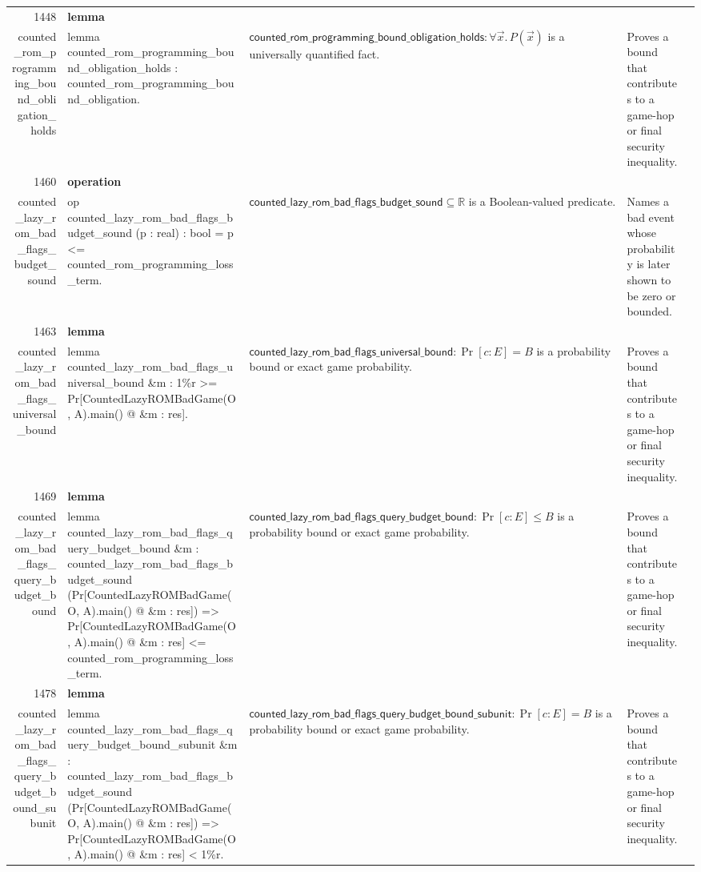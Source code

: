 \documentclass[10pt]{article}
\newcommand{\ec}[1]{\begingroup\ttfamily\scriptsize #1\endgroup}
\begin{document}
\begin{longtable}{r L{0.17\textwidth} L{0.26\textwidth} L{0.27\textwidth} L{0.20\textwidth}}
1448 & \textbf{lemma}\\\ec{counted\_rom\_programming\_bound\_obligation\_holds} & \ec{lemma counted\_rom\_programming\_bound\_obligation\_holds : counted\_rom\_programming\_bound\_obligation.} & \(\mathsf{counted\_rom\_programming\_bound\_obligation\_holds} : \forall \vec{x}.\, P(\vec{x})\) is a universally quantified fact. & Proves a bound that contributes to a game-hop or final security inequality. \\
1460 & \textbf{operation}\\\ec{counted\_lazy\_rom\_bad\_flags\_budget\_sound} & \ec{op counted\_lazy\_rom\_bad\_flags\_budget\_sound (p : real) : bool = p <= counted\_rom\_programming\_loss\_term.} & \(\mathsf{counted\_lazy\_rom\_bad\_flags\_budget\_sound} \subseteq \mathbb{R}\) is a Boolean-valued predicate. & Names a bad event whose probability is later shown to be zero or bounded. \\
1463 & \textbf{lemma}\\\ec{counted\_lazy\_rom\_bad\_flags\_universal\_bound} & \ec{lemma counted\_lazy\_rom\_bad\_flags\_universal\_bound \&m : 1\%r >= Pr[CountedLazyROMBadGame(O, A).main() @ \&m : res].} & \(\mathsf{counted\_lazy\_rom\_bad\_flags\_universal\_bound} : \Pr[c : E] = B\) is a probability bound or exact game probability. & Proves a bound that contributes to a game-hop or final security inequality. \\
1469 & \textbf{lemma}\\\ec{counted\_lazy\_rom\_bad\_flags\_query\_budget\_bound} & \ec{lemma counted\_lazy\_rom\_bad\_flags\_query\_budget\_bound \&m : counted\_lazy\_rom\_bad\_flags\_budget\_sound (Pr[CountedLazyROMBadGame(O, A).main() @ \&m : res]) => Pr[CountedLazyROMBadGame(O, A).main() @ \&m : res] <= counted\_rom\_programming\_loss\_term.} & \(\mathsf{counted\_lazy\_rom\_bad\_flags\_query\_budget\_bound} : \Pr[c : E] \le B\) is a probability bound or exact game probability. & Proves a bound that contributes to a game-hop or final security inequality. \\
1478 & \textbf{lemma}\\\ec{counted\_lazy\_rom\_bad\_flags\_query\_budget\_bound\_subunit} & \ec{lemma counted\_lazy\_rom\_bad\_flags\_query\_budget\_bound\_subunit \&m : counted\_lazy\_rom\_bad\_flags\_budget\_sound (Pr[CountedLazyROMBadGame(O, A).main() @ \&m : res]) => Pr[CountedLazyROMBadGame(O, A).main() @ \&m : res] < 1\%r.} & \(\mathsf{counted\_lazy\_rom\_bad\_flags\_query\_budget\_bound\_subunit} : \Pr[c : E] = B\) is a probability bound or exact game probability. & Proves a bound that contributes to a game-hop or final security inequality. \\

\end{longtable}
\end{document}
